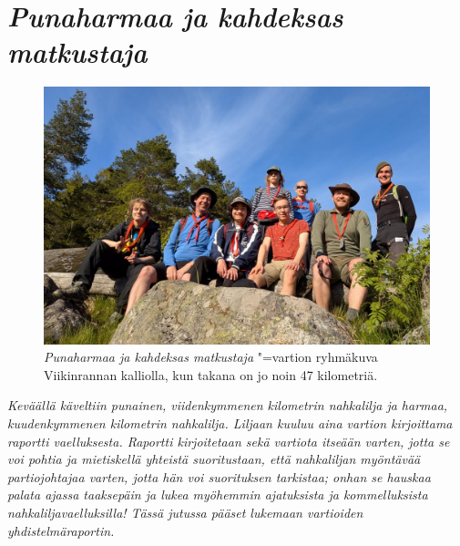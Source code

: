 \section{\textit{Punaharmaa ja kahdeksas matkustaja}}

\begin{figure}[!h]
\centering\includegraphics[width=\textwidth]{assets/liljaryhma.jpg}
\caption{\textit{Punaharmaa ja kahdeksas matkustaja} "=vartion ryhmäkuva 
Viikinrannan kalliolla, kun takana on jo noin 47 kilometriä.}
\end{figure}

\noindent\textit{Keväällä käveltiin punainen, viidenkymmenen kilometrin 
nahkalilja ja harmaa, kuudenkymmenen kilometrin nahkalilja. Liljaan kuuluu aina 
vartion kirjoittama raportti vaelluksesta. Raportti kirjoitetaan sekä vartiota 
itseään varten, jotta se voi pohtia ja mietiskellä yhteistä suoritustaan, 
että nahkaliljan myöntävää partiojohtajaa varten, jotta hän voi 
suorituksen tarkistaa; onhan se hauskaa palata ajassa taaksepäin ja lukea 
myöhemmin ajatuksista ja kommelluksista nahkaliljavaelluksilla! Tässä 
jutussa pääset lukemaan vartioiden yhdistelmäraportin.}


